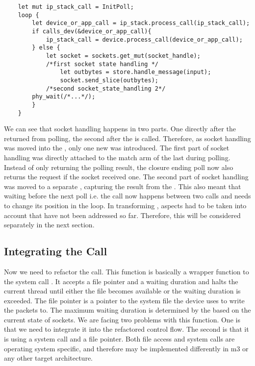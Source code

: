 \begin{verbatim}
    let mut ip_stack_call = InitPoll;
    loop {
        let device_or_app_call = ip_stack.process_call(ip_stack_call);
        if calls_dev(&device_or_app_call){
            ip_stack_call = device.process_call(device_or_app_call);
        } else {
            let socket = sockets.get_mut(socket_handle);
            /*first socket state handling */
                let outbytes = store.handle_message(input);
                socket.send_slice(outbytes);
            /*second socket_state_handling 2*/
        phy_wait(/*...*/);
        }
    }
\end{verbatim}
We can see that socket handling happens in two parts. One directly after the \stack{} returned from polling, the second after the \store{} is called. Therefore, as socket handling was moved into the \stack{}, only one new  was introduced. The first part of socket handling was directly attached to the match arm of the last  during polling. Instead of only returning the polling result, the closure ending poll now also returns the request if the socket received one. The second part of socket handling was moved to a separate , capturing the result from the \store{}. This also meant that waiting before the next poll i.e. the  call now happens between two \stack{} calls and needs to change its position in the loop. In transforming , aspects had to be taken into account that have not been addressed so far. Therefore, this will be considered separately in the next section.

\subsection{Integrating the  Call}
Now we need to refactor the  call. This function is basically a wrapper function to the system call . It accepts a file pointer and a waiting  duration and halts the current thread until either the file becomes available or the waiting duration is exceeded. The file pointer is a pointer to the system file the device uses to write the packets to. The maximum waiting duration is determined by the  based on the current state of sockets. We are facing two problems with this function. One is that we need to integrate it into the refactored control flow. The second is that it is using a system call and a file pointer. Both file access and system calls are operating system specific, and therefore may be implemented differently in m3 or any other target architecture. 

